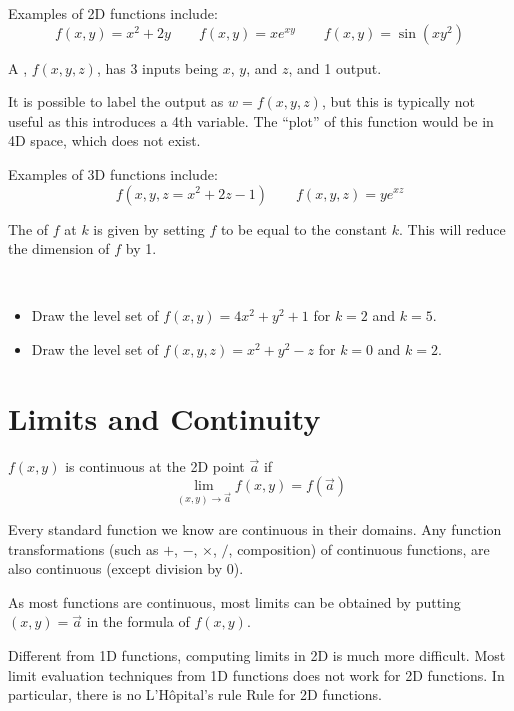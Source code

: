 \documentclass[11pt,fleqn]{book} %
\begin{document}
Examples of 2D functions include: $$f(x, y) = x^2 + 2y \qquad f(x, y) = xe^{xy} \qquad f(x, y) = \sin(xy^2)$$

\begin{definition}[3D Function]
    A , $f(x, y, z)$, has 3 inputs being $x$, $y$, and $z$, and 1 output.
\end{definition}

It is possible to label the output as $w = f(x, y, z)$, but this is typically not useful as this introduces a 4th variable. The ``plot'' of this function would be in 4D space, which does not exist.

Examples of 3D functions include: $$f(x, y, z = x^2 + 2z - 1) \qquad f(x, y, z) = ye^{xz}$$

\begin{definition}
    The  of $f$ at $k$ is given by setting $f$ to be equal to the constant $k$. This will reduce the dimension of $f$ by 1.
\end{definition}

\begin{exercise}
    $\text{ }$

    \begin{itemize}
        \item Draw the level set of $f(x, y) = 4x^2 + y^2 + 1$ for $k = 2$ and $k = 5$.
        \item Draw the level set of $f(x, y, z) = x^2 + y^2 - z$ for $k = 0$ and $k = 2$.
    \end{itemize}
\end{exercise}

\section{Limits and Continuity}

$f(x, y)$ is continuous at the 2D point $\vec{a}$ if $$\lim_{(x, y) \to \vec{a}} f(x, y) = f(\vec{a})$$

Every standard function we know are continuous in their domains. Any function transformations (such as $+$, $-$, $\times$, $/$, composition) of continuous functions, are also continuous (except division by $0$).

As most functions are continuous, most limits can be obtained by putting $(x, y) = \vec{a}$ in the formula of $f(x,y)$.

Different from 1D functions, computing limits in 2D is much more difficult. Most limit evaluation techniques from 1D functions does not work for 2D functions. In particular, there is no L'Hôpital's rule Rule for 2D functions.
\end{document}
